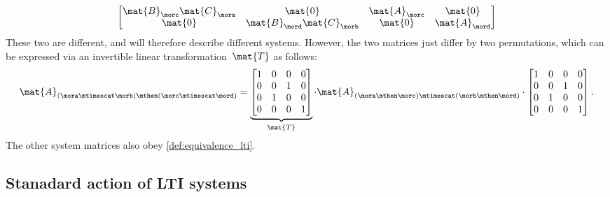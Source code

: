 \begin{example}
\begin{equation*}
\begin{bmatrix}
            \mat{B}_\morc \mat{C}_\mora & \mat{0}                     & \mat{A}_\morc & \mat{0}       \\
            \mat{0}                     & \mat{B}_\mord \mat{C}_\morb & \mat{0}       & \mat{A}_\mord
        \end{bmatrix}
    \end{equation*}
    These two are different, and will therefore describe different systems.
    However, the two matrices just differ by two permutations, which can be expressed via an invertible linear transformation~$\mat{T}$ as follows:
    \begin{equation*}
        \mat{A}_{(\mora\mtimescat \morb)\mthen (\morc\mtimescat \mord)}=
        \underbrace{\begin{bmatrix}
                1 & 0 & 0 & 0 \\
                0 & 0 & 1 & 0 \\
                0 & 1 & 0 & 0 \\
                0 & 0 & 0 & 1
            \end{bmatrix}}_{\mat{T}}\cdot
        \mat{A}_{(\mora \mthen \morc)\mtimescat (\morb\mthen \mord)}
        \cdot
        \begin{bmatrix}
            1 & 0 & 0 & 0 \\
            0 & 0 & 1 & 0 \\
            0 & 1 & 0 & 0 \\
            0 & 0 & 0 & 1
        \end{bmatrix}.
    \end{equation*}
    The other system matrices also obey \cref{def:equivalence_lti}.
\end{example}

\subsection{Stanadard action of LTI systems}

